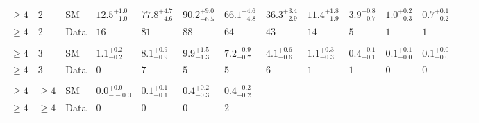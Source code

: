 \begin{landscape}
\begin{center}
\begin{table}[h!]
\begin{tabular}{ llllllllllllll }
    $\geq 4$             & $2$      & SM   & $12.5^{+1.0}_{-1.0}$           & $77.8^{+4.7}_{-4.6}$           & $90.2^{+9.0}_{-6.5}$           & $66.1^{+4.6}_{-4.8}$           & $36.3^{+3.4}_{-2.9}$           & $11.4^{+1.8}_{-1.9}$           & $3.9^{+0.8}_{-0.7}$            & $1.0^{+0.2}_{-0.3}$            & $0.7^{+0.1}_{-0.2}$            \\ 
    $\geq 4$             & $2$      & Data & $16$                           & $81$                           & $88$                           & $64$                           & $43$                           & $14$                           & $5$                            & $1$                            & $1$                            \\\\ 
    $\geq 4$             & $3$      & SM   & $1.1^{+0.2}_{-0.2}$            & $8.1^{+0.9}_{-0.9}$            & $9.9^{+1.5}_{-1.3}$            & $7.2^{+0.9}_{-0.7}$            & $4.1^{+0.6}_{-0.6}$            & $1.1^{+0.3}_{-0.3}$            & $0.4^{+0.1}_{-0.1}$            & $0.1^{+0.1}_{-0.0}$            & $0.1^{+0.0}_{-0.0}$            \\ 
    $\geq 4$             & $3$      & Data & $0$                            & $7$                            & $5$                            & $5$                            & $6$                            & $1$                            & $1$                            & $0$                            & $0$                            \\\\ 
    $\geq 4$             & $\geq 4$ & SM   & $0.0^{+0.0}_{--0.0}$           & $0.1^{+0.1}_{-0.1}$            & $0.4^{+0.2}_{-0.3}$            & $0.4^{+0.2}_{-0.2}$  & \multicolumn{7}{l}{}                                                                                                                                         \\ 
    $\geq 4$             & $\geq 4$ & Data & $0$                            & $0$                            & $0$                            & $2$                  & \multicolumn{7}{l}{}                                                                                                                                         \\

    \hline
    \hline
  \end{tabular}
\end{table}
\end{center}
\end{landscape}

